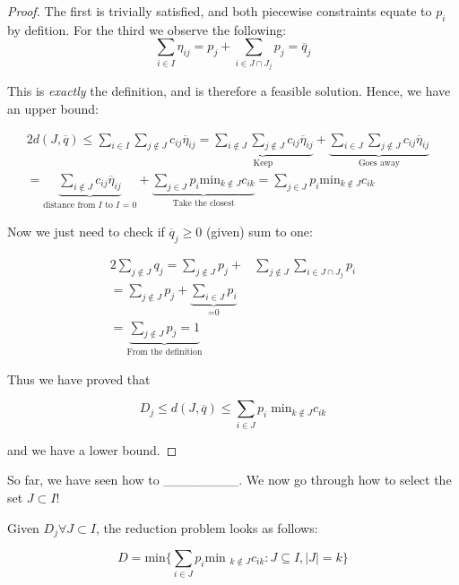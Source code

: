 \begin{proof}
The first is trivially satisfied, and both piecewise constraints equate to $p_i$ by 
defition.
For the third we observe the following:\\

\[
\sum_{i\in I} \eta_{ij} = p_j + \sum_{i\in J\cap J_j} p_j = \overline{q}_j
\]

This is \emph{exactly} the definition, and is therefore a feasible solution. Hence,
we have an upper bound:

\begin{alignat*}{2}
d(J, \overline{q}) \leq \sum_{i\in I} \sum_{j\notin J} c_{ij} \overline{\eta}_{ij}
= \underbrace{\sum_{i \notin J}\sum_{j\notin J} c_{ij} \overline{\eta}_{ij}}_{\text{Keep}}
+ \underbrace{\sum_{i \in J}\sum_{j\notin J} c_{ij} \overline{\eta}_{ij}}_{\text{Goes away}} & \\
= \underbrace{\sum_{i\notin J} c_{ij} \overline{\eta}_{ij}}_{\text{distance from $I$ to $I$ = 0}}
+ \underbrace{\sum_{j\in J} p_i \text{min}_{k\notin J} c_{ik}}_{\text{Take the closest}}
= \sum_{j\in J} p_i \text{min}_{k\notin J} c_{ik}
\end{alignat*}

Now we just need to check if $\overline{q}_j \geq 0$ (given) sum to one:

\begin{alignat*}{2}
\sum_{j\notin J} q_j = \sum_{j\notin J} p_j + &\sum_{j\notin J} \sum_{i\in J\cap J_j}p_i\\
= \sum_{j\notin J} p_j + \underbrace{\sum_{i\in J} p_i}_{\text{=0}} & \\
= \underbrace{\sum_{j\notin J} p_j = 1}_{\text{From the definition}} &
\end{alignat*}

Thus we have proved that

\[
D_j \leq d(J,\overline{q}) \leq \sum_{i \in J} p_i\; \text{min}_{k\notin J} c_{ik}
\]

and we have a lower bound.
\end{proof}

So far, we have seen how to \_\_\_\_\_\_\_\_. We now go through how to select the
set $J\subset I$!

Given $D_j \forall J\subset I$, the reduction problem looks as follows:

\begin{equation}\label{eq:redprob}
D=\text{min} \big\{ \sum_{i\in J} p_i \text{min }_{k\notin J} c_{ik} : J\subseteq I, \left\vert{J}\right\vert = k\big\}
\end{equation}

